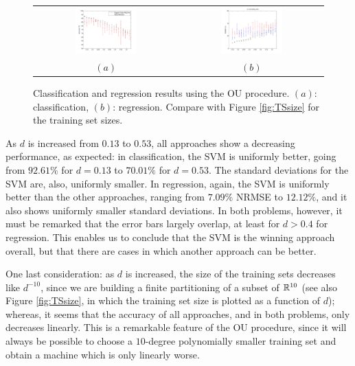 \begin{figure}[!ht] \centering
  \begin{tabular}{cc}
    \includegraphics[width=0.45\textwidth]{figs/fig_all1} &
    \includegraphics[width=0.45\textwidth]{figs/fig_all2} \\
    $(a)$ & $(b)$ \\
  \end{tabular}
  \caption{Classification and regression results using the OU
  procedure. $(a)$: classification, $(b)$: regression. Compare with
  Figure \ref{fig:TSsize} for the training set sizes.}
  \label{fig:allres}
\end{figure}

As $d$ is increased from $0.13$ to $0.53$, all approaches show a
decreasing performance, as expected: in classification, the SVM is
uniformly better, going from $92.61\%$ for $d=0.13$ to $70.01\%$ for
$d=0.53$. The standard deviations for the SVM are, also, uniformly
smaller. In regression, again, the SVM is uniformly better than the
other approaches, ranging from $7.09\%$ NRMSE to $12.12\%$, and it
also shows uniformly smaller standard deviations. In both problems,
however, it must be remarked that the error bars largely overlap, at
least for $d>0.4$ for regression. This enables us to conclude that the
SVM is the winning approach overall, but that there are cases in which
another approach can be better.

One last consideration: as $d$ is increased, the size of the training
sets decreases like $d^{-10}$, since we are building a finite
partitioning of a subset of $\RR^{10}$ (see also Figure
\ref{fig:TSsize}, in which the training set size is plotted as a
function of $d$); whereas, it seems that the accuracy of all
approaches, and in both problems, only decreases linearly. This is a
remarkable feature of the OU procedure, since it will always be
possible to choose a $10$-degree polynomially smaller training set and
obtain a machine which is only linearly worse.

